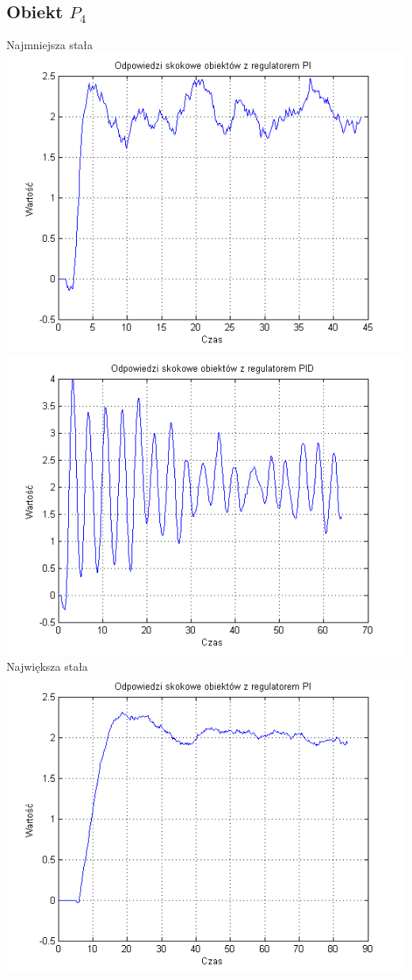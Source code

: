 \documentclass[10pt,a4paper]{article}
\begin{document}
\subsection*{Obiekt $P_4$}
Najmniejsza stała\\
\includegraphics[scale=1]{images/trzy/skrypt_07.png}\\
\includegraphics[scale=1]{images/cztery/skrypt_07.png}\\
Największa stała\\
\includegraphics[scale=1]{images/trzy/skrypt_08.png}\\
\end{document}
